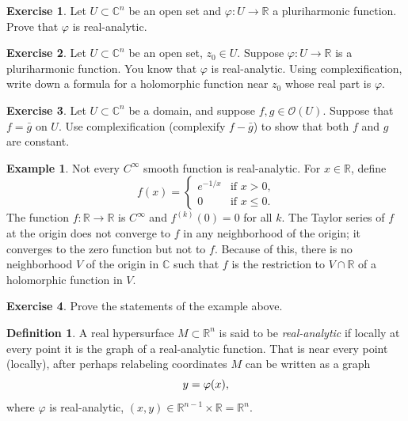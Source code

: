 \documentclass[12pt,openany]{book}
\newcommand{\avoidbreak}{\postdisplaypenalty=100}
\newcommand{\C}{{\mathbb{C}}}
\newcommand{\R}{{\mathbb{R}}}
\newcommand{\sO}{{\mathscr{O}}}
\theoremstyle{plain}
\theoremstyle{remark}
\theoremstyle{definition}
\newtheorem{defn}[thm]{Definition}
\newenvironment{exbox}{%
    \def\FrameCommand{\vrule width 1pt \relax\hspace{10pt}}%
    \MakeFramed{\advance\hsize-\width\FrameRestore}%
}{%
    \endMakeFramed
}
\theoremstyle{exercise}
\newtheorem{exercise}{Exercise}[section]
\theoremstyle{example}
\newtheorem{example}[thm]{Example}
\begin{document}
\begin{exbox}
\begin{exercise}
Let $U \subset \C^n$ be an open set and $\varphi \colon U \to \R$ a
pluriharmonic function.  Prove that $\varphi$ is real-analytic.
\end{exercise}

\begin{exercise}
Let $U \subset \C^n$ be an open set, $z_0 \in U$.
Suppose $\varphi \colon U \to \R$ is a pluriharmonic function.
You know that $\varphi$ is real-analytic.
Using complexification, write down a formula for a holomorphic function near
$z_0$ whose real part is $\varphi$.
\end{exercise}

\begin{exercise}
Let $U \subset \C^n$ be a domain, and suppose $f, g \in \sO(U)$.
Suppose that $f = \bar{g}$ on $U$.  Use complexification (complexify
$f-\bar{g}$) to show that both $f$ and $g$ are constant.
\end{exercise}
\end{exbox}

\begin{example}
Not every $C^\infty$ smooth function is real-analytic.  For $x \in \R$,
define
\begin{equation*}
f(x) =
\begin{cases}
e^{-1/x} & \text{if $x > 0$,} \\
0 & \text{if $x \leq 0$.}
\end{cases}
\end{equation*}
The function
$f \colon \R \to \R$ is $C^\infty$ and $f^{(k)}(0) = 0$ for all $k$.
The Taylor series of $f$ at the origin does
not converge to $f$ in any neighborhood of the origin; it converges to the
zero function but not to $f$.
Because of this, there is no neighborhood $V$ of the origin in $\C$ such that
$f$ is the restriction to $V \cap \R$ of a holomorphic function in $V$.
\end{example}

\begin{exbox}
\begin{exercise}
Prove the statements of the example above.
\end{exercise}
\end{exbox}

\begin{defn}
A real hypersurface $M \subset \R^n$ is said to be
\emph{real-analytic}
if locally at every point it is the graph of a real-analytic function.  That
is near every point (locally), after perhaps relabeling coordinates $M$ can be written as
a graph
\begin{equation*}
y = \varphi(x) ,
\avoidbreak
\end{equation*}
where $\varphi$ is real-analytic, $(x,y) \in \R^{n-1} \times \R = \R^n$.
\end{defn}
\end{document}
